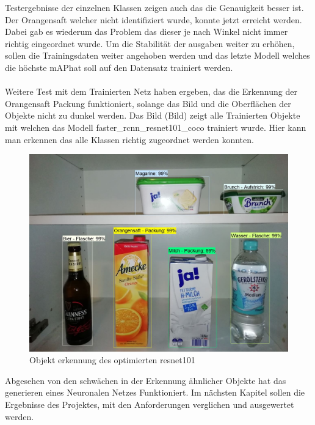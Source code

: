 \documentclass[a4paper,12pt,oneside]{article}
\begin{document}
Testergebnisse der einzelnen Klassen zeigen auch das die Genauigkeit besser ist. Der Orangensaft welcher nicht identifiziert wurde, konnte jetzt erreicht werden. Dabei gab es wiederum das Problem das dieser je nach Winkel nicht immer richtig eingeordnet wurde. Um die Stabilität der ausgaben weiter zu erhöhen, sollen die Trainingsdaten weiter angehoben werden und das letzte Modell welches die höchste \glqq mAP\grqq hat soll auf den Datensatz trainiert werden.\\
\\
Weitere Test mit dem Trainierten Netz haben ergeben, das die Erkennung der Orangensaft Packung funktioniert, solange das Bild und die Oberflächen der Objekte nicht zu dunkel werden. Das Bild (Bild) zeigt alle Trainierten Objekte mit welchen das Modell faster\_rcnn\_resnet101\_coco trainiert wurde. Hier kann man erkennen das alle Klassen richtig zugeordnet werden konnten.

\begin{figure}
    [h]
	\centering
	\includegraphics[scale=0.5]{Sources/final_detection.jpg}
	\vspace{0.3 cm}
	\caption{Objekt erkennung des optimierten resnet101}
	\label{img:loss_graph_resnet101}
\end{figure}

Abgesehen von den schwächen in der Erkennung ähnlicher Objekte hat das generieren eines Neuronalen Netzes Funktioniert. Im nächsten Kapitel sollen die Ergebnisse des Projektes, mit den Anforderungen verglichen und ausgewertet werden.

\newpage
\end{document}
